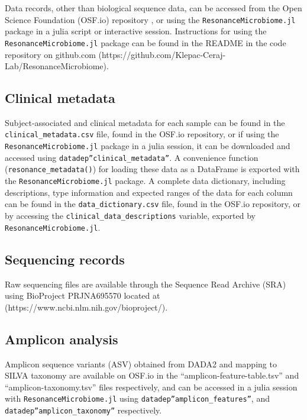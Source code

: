 \documentclass[fleqn,10pt]{wlscirep}
\begin{document}

Data records, other than biological sequence data, can be accessed from the Open Science Foundation (OSF.io) repository \cite{Bonham2021-zy},
or using the \verb|ResonanceMicrobiome.jl| package in a julia script or interactive session.
Instructions for using the \verb|ResonanceMicrobiome.jl| package can be found in the README in the code repository on github.com (https://github.com/Klepac-Ceraj-Lab/ResonanceMicrobiome).

\subsection*{Clinical metadata}

Subject-associated and clinical metadata for each sample can be found in the \verb|clinical_metadata.csv| file,
found in the OSF.io repository, or if using the \verb|ResonanceMicrobiome.jl| package in a julia session,
it can be downloaded and accessed using \verb|datadep”clinical_metadata”|.
A convenience function (\verb|resonance_metadata()|) for loading these data as a DataFrame
is exported with the \verb|ResonanceMicrobiome.jl| package.
A complete data dictionary, including descriptions, type information and expected ranges of the data for each column
can be found in the \verb|data_dictionary.csv| file, found in the OSF.io repository,
or by accessing the \verb|clinical_data_descriptions| variable, exported by \verb|ResonanceMicrobiome.jl|.

\subsection*{Sequencing records}

Raw sequencing files are available through the Sequence Read Archive (SRA) using BioProject PRJNA695570
located at (https://www.ncbi.nlm.nih.gov/bioproject/).

\subsection*{Amplicon analysis}

Amplicon sequence variants (ASV) obtained from DADA2 and mapping to SILVA taxonomy are available on OSF.io
in the “amplicon-feature-table.tsv” and “amplicon-taxonomy.tsv” files respectively,
and can be accessed in a julia session with \verb|ResonanceMicrobiome.jl| using \verb|datadep”amplicon_features”|,
and \verb|datadep”amplicon_taxonomy”| respectively.
\end{document}
